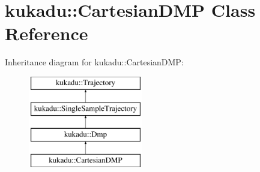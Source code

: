 \hypertarget{classkukadu_1_1CartesianDMP}{\section{kukadu\-:\-:Cartesian\-D\-M\-P Class Reference}
\label{classkukadu_1_1CartesianDMP}
}
Inheritance diagram for kukadu\-:\-:Cartesian\-D\-M\-P\-:\begin{figure}[H]
\begin{center}
\leavevmode
\includegraphics[height=4.000000cm]{classkukadu_1_1CartesianDMP}
\end{center}
\end{figure}
